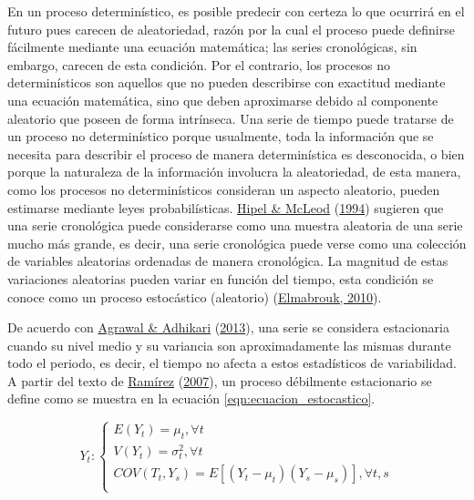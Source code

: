 \documentclass[
]{article}
\begin{document}
En un proceso determinístico, es posible predecir con certeza lo que
ocurrirá en el futuro pues carecen de aleatoriedad, razón por la cual el
proceso puede definirse fácilmente mediante una ecuación matemática; las
series cronológicas, sin embargo, carecen de esta condición. Por el
contrario, los procesos no determinísticos son aquellos que no pueden
describirse con exactitud mediante una ecuación matemática, sino que
deben aproximarse debido al componente aleatorio que poseen de forma
intrínseca. Una serie de tiempo puede tratarse de un proceso no
determinístico porque usualmente, toda la información que se necesita
para describir el proceso de manera determinística es desconocida, o
bien porque la naturaleza de la información involucra la aleatoriedad,
de esta manera, como los procesos no determinísticos consideran un
aspecto aleatorio, pueden estimarse mediante leyes probabilísticas.
\protect\hyperlink{ref-Hipel}{Hipel \& McLeod}
(\protect\hyperlink{ref-Hipel}{1994}) sugieren que una serie cronológica
puede considerarse como una muestra aleatoria de una serie mucho más
grande, es decir, una serie cronológica puede verse como una colección
de variables aleatorias ordenadas de manera cronológica. La magnitud de
estas variaciones aleatorias pueden variar en función del tiempo, esta
condición se conoce como un proceso estocástico (aleatorio)
(\protect\hyperlink{ref-definicion_estocastico}{Elmabrouk, 2010}).

De acuerdo con \protect\hyperlink{ref-stationary_def}{Agrawal \&
Adhikari} (\protect\hyperlink{ref-stationary_def}{2013}), una serie se
considera estacionaria cuando su nivel medio y su variancia son
aproximadamente las mismas durante todo el periodo, es decir, el tiempo
no afecta a estos estadísticos de variabilidad. A partir del texto de
\protect\hyperlink{ref-introduccion_series}{Ramírez}
(\protect\hyperlink{ref-introduccion_series}{2007}), un proceso
débilmente estacionario se define como se muestra en la ecuación
\eqref{eqn:ecuacion_estocastico}.

\begin{equation}
\label{eqn:ecuacion_estocastico}
Y_t:
\begin{cases}
E(Y_t) = \mu_t, \forall t \\
V(Y_t) = \sigma^2_t, \forall t \\
COV(T_t,Y_s) = E\left[(Y_t-\mu_t)(Y_s-\mu_s)\right], \forall t,s \\
\end{cases}
\end{equation}
\end{document}

